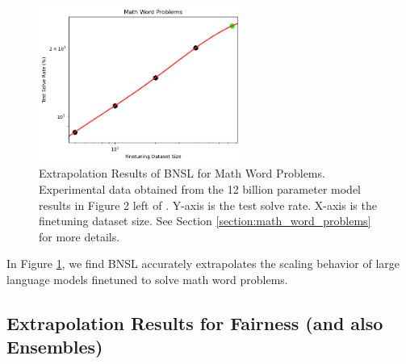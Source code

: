 \documentclass{article} %
\begin{document}
\begin{figure}[htbp]
    \centering
\includegraphics[width=0.59\textwidth]{figures/math_word_problems/dataset_size__12b_params.png}
    \caption{
Extrapolation Results of BNSL for Math Word Problems. Experimental data obtained from the 12 billion parameter model results in Figure 2 left of \cite{cobbe2021training}. Y-axis is the test solve rate. X-axis is the finetuning dataset size. See Section \ref{section:math_word_problems} for more details.
    }
    \label{fig:math_word_problems}
\end{figure}

In Figure \ref{fig:math_word_problems}, we find BNSL accurately extrapolates the scaling behavior of large language models finetuned to solve math word problems.


\subsection{Extrapolation Results for Fairness (and also Ensembles)}
\label{section:fairness}
\end{document}

